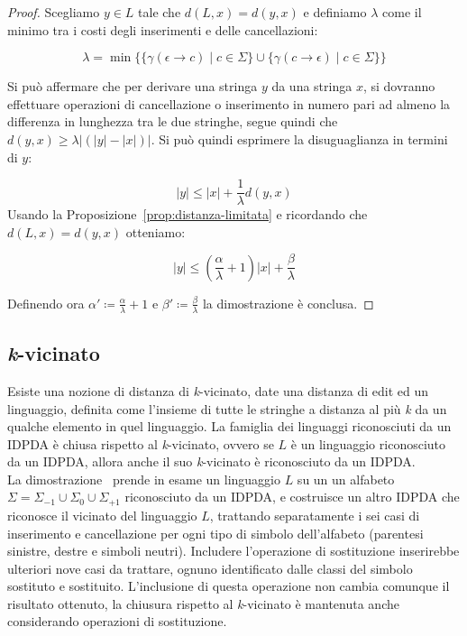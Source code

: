 \documentclass[a4paper,12pt]{report}
\theoremstyle{propositionstyle}
\begin{document}
    \begin{proof}
        Scegliamo $y \in L$ tale che $d\left(L, x\right) = d\left(y, x\right)$ e definiamo $\lambda$ come il minimo tra i costi degli inserimenti e delle cancellazioni:

        \[
            \lambda = \min\bigl\{\{\gamma\left(\epsilon \rightarrow c\right) \mid c \in \Sigma\} \cup \{\gamma\left(c \rightarrow \epsilon\right) \mid c \in \Sigma\}\bigr\}
        \]

        Si può affermare che per derivare una stringa $y$ da una stringa $x$, si dovranno effettuare operazioni di cancellazione o inserimento in numero pari
        ad almeno la differenza in lunghezza tra le due stringhe, segue quindi che $d\left(y, x\right) \geq \lambda\bigl|\left(\lvert y \rvert - \lvert x \rvert\right)\bigr|$.
        Si può quindi esprimere la disuguaglianza in termini di $y$:

        \[
            \lvert y \rvert \leq \lvert x \rvert + \frac{1}{\lambda}d\left(y, x\right)
        \]
        Usando la Proposizione~\ref{prop:distanza-limitata} e ricordando che $d\left(L, x\right) = d\left(y, x\right)$ otteniamo:

        \[
            \lvert y \rvert \leq \left(\frac{\alpha}{\lambda} + 1\right)\lvert x \rvert + \frac{\beta}{\lambda}
        \]
        \vspace{0.5em}

        Definendo ora $\displaystyle \alpha' \coloneqq \frac{\alpha}{\lambda} + 1$ e $\displaystyle \beta' \coloneqq \frac{\beta}{\lambda}$ la dimostrazione è conclusa.
    \end{proof}

    \subsection{\textit{k}-vicinato}

    Esiste una nozione di distanza di \textit{k}-vicinato, date una distanza di edit ed un linguaggio, definita come l'insieme di tutte le stringhe a distanza al più \textit{k} da un qualche elemento in quel linguaggio.
    La famiglia dei linguaggi riconosciuti da un IDPDA è chiusa rispetto al \textit{k}-vicinato, ovvero se $L$ è un linguaggio riconosciuto da un IDPDA, allora anche il suo \textit{k}-vicinato è riconosciuto da un IDPDA. \\
    La dimostrazione~\cite{neighborhood} prende in esame un linguaggio $L$ su un un alfabeto $\Sigma = \Sigma_{-1} \cup \Sigma_{0} \cup \Sigma_{+1}$ riconosciuto da un IDPDA, e costruisce
    un altro IDPDA che riconosce il vicinato del linguaggio $L$, trattando separatamente i sei casi di inserimento e cancellazione per ogni tipo di simbolo dell'alfabeto (parentesi sinistre, destre e simboli neutri).
    Includere l'operazione di sostituzione inserirebbe ulteriori nove casi da trattare, ognuno identificato dalle classi del simbolo sostituto e sostituito.
    L'inclusione di questa operazione non cambia comunque il risultato ottenuto, la chiusura rispetto al \textit{k}-vicinato è mantenuta anche considerando operazioni di sostituzione.
\end{document}
